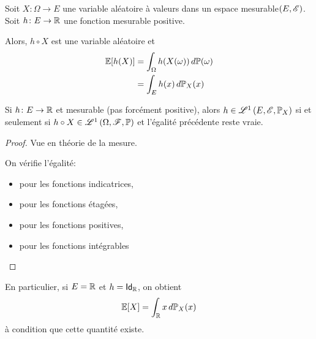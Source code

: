 \begin{proposition}
    Soit \(X\colon \Omega\to E\) une variable aléatoire à valeurs
    dans un espace mesurable\(\left(E, \mathscr{E}\right)\). Soit
    \(h\colon E\to\mathbb{R}\) une fonction mesurable positive.

    Alors, \(h\circ X\) est une variable aléatoire et
    \begin{equation*}
        \begin{aligned}
            \mathbb{E}\mathopen{}\left[h(X)\right]\mathclose{} 
            &= \int_{\Omega} h(X(\omega))\mathop{}\!{d}\mathbb{P}(\omega)\\
            &=\int_{E} h(x)\mathop{}\!{d}\mathbb{P}_X(x)
        \end{aligned}
    \end{equation*}

    Si \(h\colon E\to\mathbb{R}\) et mesurable (pas forcément positive),
    alors \(h\in\mathscr{L}^1\left(E, \mathscr{E}, \mathbb{P}_X\right)\) si et seulement
    si \(h\circ X\in\mathscr{L}^1\left(\Omega, \mathscr{F}, \mathbb{P}\right)\)
    et l'égalité précédente reste vraie.
\end{proposition}

\begin{proof}
    Vue en théorie de la mesure.

    On vérifie l'égalité:
    \begin{itemize}
        \item pour les fonctions indicatrices,
        \item pour les fonctions étagées,
        \item pour les fonctions positives,
        \item pour les fonctions intégrables
    \end{itemize}
\end{proof}

\begin{remark}
    En particulier, si \(E = \mathbb{R}\) et \(h=\operatorname{\mathsf{Id}}_{\mathbb{R}}\), on 
    obtient
    \begin{equation*}
        \mathbb{E}\mathopen{}\left[X\right]\mathclose{} = \int_{\mathbb{R}} x\mathop{}\!{d}\mathbb{P}_X(x)
    \end{equation*}
    à condition que cette quantité existe.
\end{remark}

